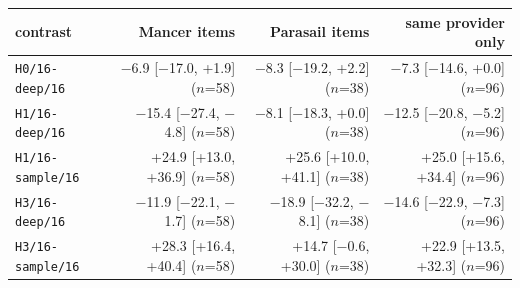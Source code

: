 \begin{tabular}{lrrr}
\toprule
contrast & Mancer items & Parasail items & same provider only \\ \midrule
\texttt{H0/16-deep/16} & $-$6.9 [$-$17.0, +1.9] ($n$=58) & $-$8.3 [$-$19.2, +2.2] ($n$=38) & $-$7.3 [$-$14.6, +0.0] ($n$=96) \\
\texttt{H1/16-deep/16} & $-$15.4 [$-$27.4, $-$4.8] ($n$=58) & $-$8.1 [$-$18.3, +0.0] ($n$=38) & $-$12.5 [$-$20.8, $-$5.2] ($n$=96) \\
\texttt{H1/16-sample/16} & +24.9 [+13.0, +36.9] ($n$=58) & +25.6 [+10.0, +41.1] ($n$=38) & +25.0 [+15.6, +34.4] ($n$=96) \\
\texttt{H3/16-deep/16} & $-$11.9 [$-$22.1, $-$1.7] ($n$=58) & $-$18.9 [$-$32.2, $-$8.1] ($n$=38) & $-$14.6 [$-$22.9, $-$7.3] ($n$=96) \\
\texttt{H3/16-sample/16} & +28.3 [+16.4, +40.4] ($n$=58) & +14.7 [$-$0.6, +30.0] ($n$=38) & +22.9 [+13.5, +32.3] ($n$=96) \\
\bottomrule
\end{tabular}
